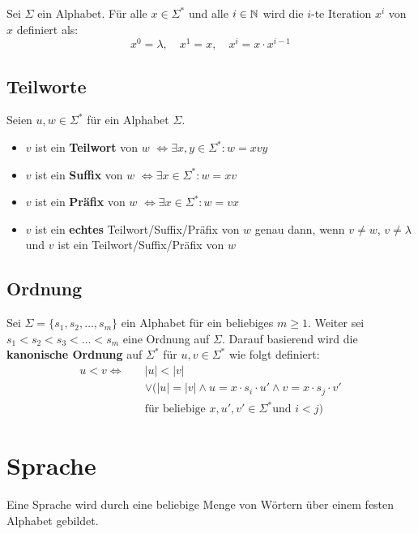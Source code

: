 \begin{definition}
Sei $\Sigma$ ein Alphabet. Für alle $x \in \Sigma^*$ und alle $i \in \mathbb{N}$ wird die $i$-te Iteration $x^i$ von $x$ definiert als:
\[
x^0 = \lambda,\quad x^1 = x,\quad x^i = x \cdot x^{i-1}
\]
\end{definition}

\subsection{Teilworte}
\begin{definition}
Seien $u, w \in \Sigma^*$ für ein Alphabet $\Sigma$.
\begin{itemize}
  \item $v$ ist ein \textbf{Teilwort} von $w$ $\Leftrightarrow \exists x, y \in \Sigma^*: w = xvy$
  \item $v$ ist ein \textbf{Suffix} von $w$ $\Leftrightarrow \exists x \in \Sigma^*: w = xv$
  \item $v$ ist ein \textbf{Präfix} von $w$ $\Leftrightarrow \exists x \in \Sigma^*: w = vx$
  \item $v$ ist ein \textbf{echtes} Teilwort/Suffix/Präfix von $w$ genau dann, wenn $v \not= w$, $v \not= \lambda$ und $v$ ist ein Teilwort/Suffix/Präfix von $w$
\end{itemize}

\end{definition}

\subsection{Ordnung}
\begin{definition}
Sei $\Sigma = \{s_1, s_2, \ldots, s_m\}$ ein Alphabet für ein beliebiges $m \geq 1$. Weiter sei $s_1 < s_2 < s_3 < \ldots < s_m$ eine Ordnung auf $\Sigma$. Darauf basierend wird die \textbf{kanonische Ordnung} auf $\Sigma^*$ für $u, v \in \Sigma^*$ wie folgt definiert:
\begin{align*}
u < v \Leftrightarrow \quad & |u| < |v|\\
&\lor (|u| = |v| \land u = x \cdot s_i \cdot u' \land v = x \cdot s_j \cdot v'\\
&\text{für beliebige } x, u', v' \in \Sigma^* \text{und } i < j)
\end{align*}

\end{definition}

\section{Sprache}
Eine Sprache wird durch eine beliebige Menge von Wörtern über einem festen Alphabet gebildet.

